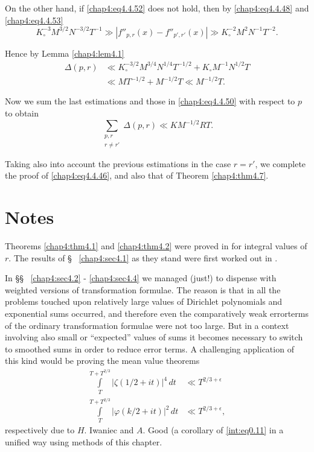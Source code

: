On the other hand, if \eqref{chap4:eq4.4.52} does not hold, then by \eqref{chap4:eq4.4.48} and \eqref{chap4:eq4.4.53}
$$
K_\circ^{-3}M^{3/2}N^{-3/2}T^{-1}\gg\left|f''_{p,r}(x)-f''_{p',r'}(x)\right|\gg K_\circ^{-2}M^2N^{-1}T^{-2}.
$$

Hence by Lemma \ref{chap4:lem4.1}
\begin{align*}
\Delta(p,r) &\ll K_\circ^{-3/2}M^{3/4}N^{1/4}T^{-1/2}+K_\circ M^{-1}N^{1/2}T\\
&\ll MT^{-1/2}+M^{-1/2}T\ll M^{-1/2}T.
\end{align*}

Now we sum the last estimations and those in \eqref{chap4:eq4.4.50} with respect to $p$ to obtain
$$
\sum_{\substack{p,r\\r\neq r'}}\Delta(p,r)\ll KM^{-1/2}RT.
$$

Taking also into account the previous estimations in the case $r=r'$, we complete the proof of \eqref{chap4:eq4.4.46}, and also that of Theorem \ref{chap4:thm4.7}.


\bigskip
 
\section*{Notes}

Theorems \ref{chap4:thm4.1} and \ref{chap4:thm4.2} were proved in \cite{key16} for integral values of $r$. The results of \S~ \ref{chap4:sec4.1} as they stand were first worked out in \cite{key17}.

In \S\S~ \ref{chap4:sec4.2} - \ref{chap4:sec4.4} we managed (just!) to dispense with weighted versions of transformation formulae. The reason is that in all the problems touched upon relatively large values of Dirichlet polynomials and exponential sums occurred, and therefore even the comparatively weak error\pageoriginale terms of the ordinary transformation formulae were not too large. But in a context involving also small or ``expected'' values of sums it becomes necessary to switch to smoothed sums in order to reduce error terms. A challenging application of this kind would be proving the mean value theorems 
\begin{align*}
\int\limits_T^{T+T^{2/3}}\left|\zeta(1/2+it)\right|^4\,dt &\ll T^{2/3+\epsilon}\\
\int\limits_T^{T+T^{2/3}}\left|\varphi(k /2+it)\right|^2\,dt &\ll T^{2/3+\epsilon},
\end{align*}
respectively due to $H$. Iwaniec \cite{key14} and $A$. Good \cite{key9} (a corollary of \eqref{int:eq0.11} in a unified way using methods of this chapter.

